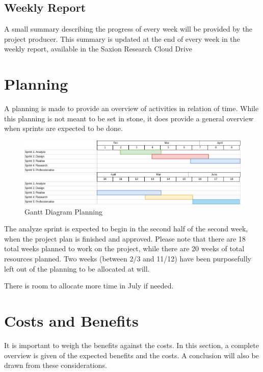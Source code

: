 \documentclass[11pt, a4paper]{article}
\begin{document}
\subsection{Weekly Report}\label{projectorganization:weeklyreport}
A small summary describing the progress of every week will be provided by the project producer. This summary is updated at the end of every week in the weekly report, available in the Saxion Research Cloud Drive \cite{saxrcd}

\pagebreak

\section{Planning}\label{planning}
A planning is made to provide an overview of activities in relation of time. While this planning is not meant to be set in stone, it does provide a general overview when sprints are expected to be done.


\begin{figure}[h]
    \center
    \includegraphics[width=1.05\textwidth, angle=90]{ganttdiagram.png}
    \caption{Gantt Diagram Planning}
    \label{fig:ganttdiagram}
\end{figure}

The analyze sprint is expected to begin in the second half of the second week, when the project plan is finished and approved. Please note that there are 18 total weeks planned to work on the project, while there are 20 weeks of total resources planned. Two weeks (between 2/3 and 11/12) have been purposefully left out of the planning to be allocated at will. 

There is room to allocate more time in July if needed.
\pagebreak
\section{Costs and Benefits}\label{costsandbenefits}
It is important to weigh the benefits against the costs. In this section, a complete overview is given of the expected benefits and the costs. A conclusion will also be drawn from these considerations.
\end{document}
